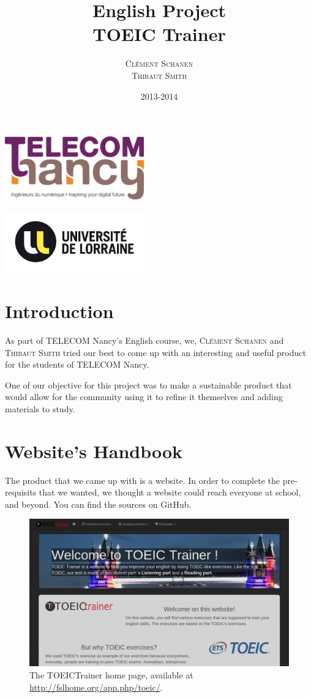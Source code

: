 \documentclass[12pt,a4paper]{report}
\title{English Project \\ \textbf{TOEIC Trainer}}
\author{\textsc{Clément Schanen} \\ \textsc{Thibaut Smith}}
\date{2013-2014}
\makeatletter
\def\maketitle{
\begin{minipage}{0.54\textwidth}
\begin{flushleft} \large
\LARGE \@author
\end{flushleft}
\end{minipage}
\begin{minipage}{0.4\textwidth}
\begin{flushright} \large
\end{flushright}
\end{minipage}
  \vfill
  \begin{center}\leavevmode
    \normalfont
    {\LARGE \@title\par}%
    {\Large \@date\par}
    \vskip 1cm
  \end{center}%
  \vfill
  \hfill
  
\begin{minipage}{0.54\textwidth}
\begin{flushleft} \large
\includegraphics[width=6cm]{telecomnancy.jpg}


\end{flushleft}
\end{minipage}
\begin{minipage}{0.4\textwidth}
\begin{flushright} \large
\includegraphics[width=6cm]{univ-lorraine.jpg}
\end{flushright}
\end{minipage}
  \cleardoublepage
  }
\makeatother
\begin{document}
\pagestyle{empty} %

\maketitle %

\pagestyle{plain}
\setcounter{page}{2}

\tableofcontents
\section*{Introduction}
As part of TELECOM Nancy's English course, we, \textsc{Clément Schanen} and
\textsc{Thibaut Smith} tried our best to come up with an interesting and
useful product for the students of TELECOM Nancy.

One of our objective for this project was to make a sustainable product that
would allow for the community using it to refine it themselves and adding
materials to study.

\pagebreak
\section{Website's Handbook}

The product that we came up with is a website\cite{TOEICTrainer}. In order to complete the pre-requisits that we wanted, we thought a website could reach everyone at school, and beyond. You can find the sources on GitHub\cite{github_tc}.

\begin{figure}[here]
\includegraphics[scale=0.35]{homepage.png}
\caption{The TOEICTrainer home page, available at \url{http://fslhome.org/app.php/toeic/}.}
\label{homepage}
\end{figure}
\end{document}
